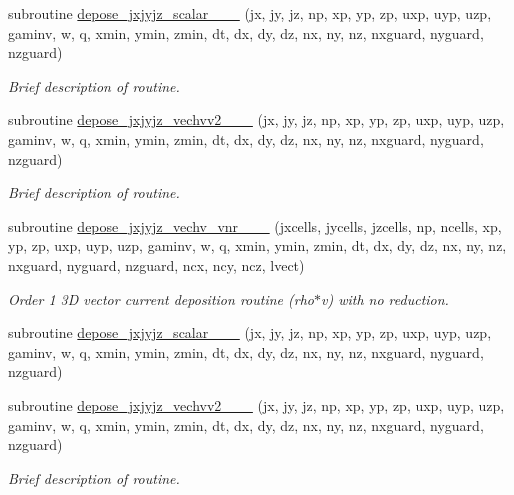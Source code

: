 \begin{DoxyCompactItemize}
subroutine \hyperlink{current__deposition_8_f90_a7347c7791083dae1b946cdbdce60602f}{depose\+\_\+jxjyjz\+\_\+scalar\+\_\+\_\+\_} (jx, jy, jz, np, xp, yp, zp, uxp, uyp, uzp, gaminv, w, q, xmin, ymin, zmin,                                       dt, dx, dy, dz, nx, ny, nz, nxguard, nyguard, nzguard)
\begin{DoxyCompactList}\small\item\em Brief description of routine. \end{DoxyCompactList}\item 
subroutine \hyperlink{current__deposition_8_f90_a084ed42e79187e34df1e5e49cb589e87}{depose\+\_\+jxjyjz\+\_\+vechvv2\+\_\+\_\+\_} (jx, jy, jz, np, xp, yp, zp, uxp, uyp, uzp, gaminv, w, q, xmin, ymin, zmin,                                       dt, dx, dy, dz, nx, ny, nz, nxguard, nyguard, nzguard)
\begin{DoxyCompactList}\small\item\em Brief description of routine. \end{DoxyCompactList}\item 
subroutine \hyperlink{current__deposition_8_f90_a640df01330ec2f2b5ffcb43938a71db5}{depose\+\_\+jxjyjz\+\_\+vechv\+\_\+vnr\+\_\+\_\+\_} (jxcells, jycells, jzcells, np, ncells, xp, yp, zp,                                   uxp, uyp, uzp, gaminv, w, q, xmin, ymin, zmin,                                       dt, dx, dy, dz, nx, ny, nz, nxguard, nyguard, nzguard, ncx, ncy, ncz, lvect)
\begin{DoxyCompactList}\small\item\em Order 1 3D vector current deposition routine (rho$\ast$v) with no reduction. \end{DoxyCompactList}\item 
subroutine \hyperlink{current__deposition_8_f90_a3b2c43f71118a3d22ad1d1fea9494fa4}{depose\+\_\+jxjyjz\+\_\+scalar\+\_\+\_\+\_} (jx, jy, jz, np, xp, yp, zp, uxp, uyp, uzp, gaminv, w, q, xmin, ymin, zmin,                                       dt, dx, dy, dz, nx, ny, nz, nxguard, nyguard, nzguard)
\item 
subroutine \hyperlink{current__deposition_8_f90_a82878814b59bae3273786c1c0e92deb6}{depose\+\_\+jxjyjz\+\_\+vechvv2\+\_\+\_\+\_} (jx, jy, jz, np, xp, yp, zp, uxp, uyp, uzp, gaminv, w, q, xmin, ymin, zmin,                                       dt, dx, dy, dz, nx, ny, nz, nxguard, nyguard, nzguard)
\begin{DoxyCompactList}\small\item\em Brief description of routine. \end{DoxyCompactList}\item 

\end{DoxyCompactItemize}
